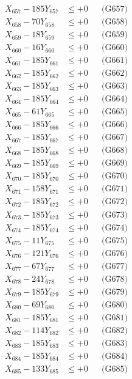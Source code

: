 \documentclass[a4paper,10pt]{article}
\begin{document}
{\begin{align}
X_{657} - 185Y_{657} &\leq +0 && \text{(G657)} \\
X_{658} - 70Y_{658} &\leq +0 && \text{(G658)} \\
X_{659} - 18Y_{659} &\leq +0 && \text{(G659)} \\
X_{660} - 16Y_{660} &\leq +0 && \text{(G660)} \\
\allowbreak
X_{661} - 185Y_{661} &\leq +0 && \text{(G661)} \\
X_{662} - 185Y_{662} &\leq +0 && \text{(G662)} \\
X_{663} - 185Y_{663} &\leq +0 && \text{(G663)} \\
X_{664} - 185Y_{664} &\leq +0 && \text{(G664)} \\
X_{665} - 61Y_{665} &\leq +0 && \text{(G665)} \\
X_{666} - 185Y_{666} &\leq +0 && \text{(G666)} \\
X_{667} - 185Y_{667} &\leq +0 && \text{(G667)} \\
X_{668} - 185Y_{668} &\leq +0 && \text{(G668)} \\
X_{669} - 185Y_{669} &\leq +0 && \text{(G669)} \\
X_{670} - 185Y_{670} &\leq +0 && \text{(G670)} \\
\allowbreak
X_{671} - 158Y_{671} &\leq +0 && \text{(G671)} \\
X_{672} - 185Y_{672} &\leq +0 && \text{(G672)} \\
X_{673} - 185Y_{673} &\leq +0 && \text{(G673)} \\
X_{674} - 185Y_{674} &\leq +0 && \text{(G674)} \\
X_{675} - 11Y_{675} &\leq +0 && \text{(G675)} \\
X_{676} - 121Y_{676} &\leq +0 && \text{(G676)} \\
X_{677} - 67Y_{677} &\leq +0 && \text{(G677)} \\
X_{678} - 24Y_{678} &\leq +0 && \text{(G678)} \\
X_{679} - 185Y_{679} &\leq +0 && \text{(G679)} \\
X_{680} - 69Y_{680} &\leq +0 && \text{(G680)} \\
\allowbreak
X_{681} - 185Y_{681} &\leq +0 && \text{(G681)} \\
X_{682} - 114Y_{682} &\leq +0 && \text{(G682)} \\
X_{683} - 185Y_{683} &\leq +0 && \text{(G683)} \\
X_{684} - 185Y_{684} &\leq +0 && \text{(G684)} \\
X_{685} - 133Y_{685} &\leq +0 && \text{(G685)} \\

\end{align}}
\end{document}
